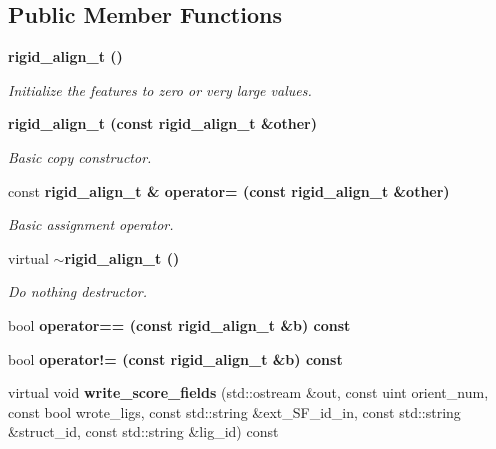 \subsection*{Public Member Functions}
\begin{CompactItemize}
\item 
\bf{rigid\_\-align\_\-t} ()\label{classASCbase_1_1rigid__align__t_e6335cc41892b44aba75afb30c42422b}

\begin{CompactList}\small\item\em Initialize the features to zero or very large values. \item\end{CompactList}\item 
\bf{rigid\_\-align\_\-t} (const \bf{rigid\_\-align\_\-t} \&other)\label{classASCbase_1_1rigid__align__t_e05610ac44e3120513667837de227445}

\begin{CompactList}\small\item\em Basic copy constructor. \item\end{CompactList}\item 
const \bf{rigid\_\-align\_\-t} \& \bf{operator=} (const \bf{rigid\_\-align\_\-t} \&other)\label{classASCbase_1_1rigid__align__t_e42d7414871c06710daf9f23d71d349d}

\begin{CompactList}\small\item\em Basic assignment operator. \item\end{CompactList}\item 
virtual \bf{$\sim$rigid\_\-align\_\-t} ()\label{classASCbase_1_1rigid__align__t_be237ac53c1d6917a5ff2c717574b955}

\begin{CompactList}\small\item\em Do nothing destructor. \item\end{CompactList}\item 
bool \bf{operator==} (const \bf{rigid\_\-align\_\-t} \&b) const 
\item 
bool \bf{operator!=} (const \bf{rigid\_\-align\_\-t} \&b) const 
\item 
virtual void \textbf{write\_\-score\_\-fields} (std::ostream \&out, const uint orient\_\-num, const bool wrote\_\-ligs, const std::string \&ext\_\-SF\_\-id\_\-in, const std::string \&struct\_\-id, const std::string \&lig\_\-id) const \label{classASCbase_1_1rigid__align__t_12c292600e42cb9e61a87201d38b574d}


\end{CompactItemize}
